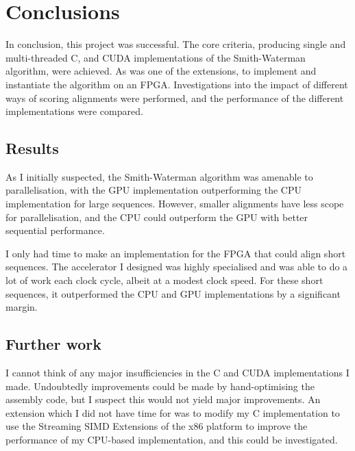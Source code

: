 
\chapter{Conclusions}

In conclusion, this project was successful.
The core criteria, producing single and multi-threaded C, and CUDA implementations of the Smith-Waterman algorithm, were achieved.
As was one of the extensions, to implement and instantiate the algorithm on an FPGA.
Investigations into the impact of different ways of scoring alignments were performed, and the performance of the different implementations were compared.

\section{Results}
\label{sec:Concl_results}

As I initially suspected, the Smith-Waterman algorithm was amenable to parallelisation, with the GPU implementation outperforming the CPU implementation for large sequences.
However, smaller alignments have less scope for parallelisation, and the CPU could outperform the GPU with better sequential performance.

I only had time to make an implementation for the FPGA that could align short sequences.
The accelerator I designed was highly specialised and was able to do a lot of work each clock cycle, albeit at a modest clock speed.
For these short sequences, it outperformed the CPU and GPU implementations by a significant margin.

\section{Further work}
\label{sec:Concl_further work}

I cannot think of any major insufficiencies in the C and CUDA implementations I made.
Undoubtedly improvements could be made by hand-optimising the assembly code, but I suspect this would not yield major improvements.
An extension which I did not have time for was to modify my C implementation to use the Streaming SIMD Extensions of the x86 platform to improve the performance of my CPU-based implementation, and this could be investigated.

